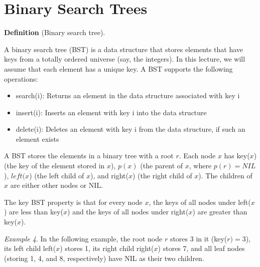 \documentclass [12pt]{article}
\begin{document}
\section{Binary Search Trees} 
\textbf{Definition} (Binary search tree).

A binary search tree (BST) is a data structure that stores elements that have keys from a totally ordered universe (say, the integers). In this lecture, we will assume that each element has a unique key. A BST supports the following operations: 

\begin{itemize}
  \item search(i): Returns an element in the data structure associated with key i
  \item insert(i): Inserts an element with key i into the data structure
  \item delete(i): Deletes an element with key i from the data structure, if such an element exists
\end{itemize}

A BST stores the elements in a binary tree with a root $r$. Each node $x$ has key($x$) (the key of the element stored in $x$), $p(x)$ (the parent of $x$, where $p(r ) = NIL$), $left(x$) (the left child of $x$), and right($x$) (the right child of $x$). The children of $x$ are either other nodes or NIL.

The key BST property is that for every node $x$, the keys of all nodes under left($x$) are less than key($x$) and the keys of all nodes under right($x$) are greater than key($x$).

\textit{Example 4}. In the following example, the root node $r$ stores $3$ in it (key($r) = 3$), its left child left($x$) stores 1, its right child right($x$) stores 7, and all leaf nodes (storing 1, 4, and 8, respectively) have NIL as their two children.

\begin{center}
\end{center}
\end{document}
